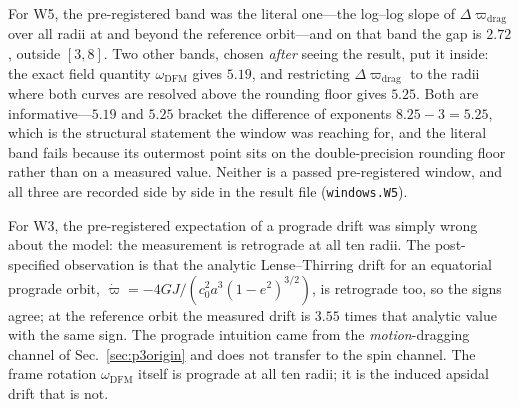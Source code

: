 \documentclass[aps,reprint,amsmath,amssymb,nofootinbib,superscriptaddress,floatfix]{revtex4-2}
\begin{document}
For W5, the pre-registered band was the literal one---the log--log slope
of $\Delta\varpi_{\mathrm{drag}}$ over all radii at and beyond the
reference orbit---and on that band the gap is $2.72$, outside $[3,8]$.
Two other bands, chosen \emph{after} seeing the result, put it inside:
the exact field quantity $\omega_{\mathrm{DFM}}$ gives $5.19$, and
restricting $\Delta\varpi_{\mathrm{drag}}$ to the radii where both
curves are resolved above the rounding floor gives $5.25$.
Both are informative---$5.19$ and $5.25$ bracket the difference of
exponents $8.25-3=5.25$, which is the structural statement the window
was reaching for, and the literal band fails because its outermost point
sits on the double-precision rounding floor rather than on a measured
value.
Neither is a passed pre-registered window, and all three are recorded
side by side in the result file (\texttt{windows.W5}).

For W3, the pre-registered expectation of a prograde drift was simply
wrong about the model: the measurement is retrograde at all ten radii.
The post-specified observation is that the analytic Lense--Thirring
drift for an equatorial prograde orbit,
$\dot\varpi=-4GJ/(c_0^{2}a^{3}(1-e^{2})^{3/2})$, is retrograde too, so
the signs agree; at the reference orbit the measured drift is $3.55$
times that analytic value with the same sign.
The prograde intuition came from the \emph{motion}-dragging channel of
Sec.~\ref{sec:p3origin} and does not transfer to the spin channel.
The frame rotation $\omega_{\mathrm{DFM}}$ itself is prograde at all ten
radii; it is the induced apsidal drift that is not.
\end{document}
